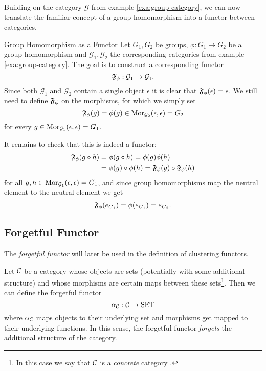 Building on the category $\mathcal{G}$ from example \ref{exa:group-category}, we can now translate the familiar concept of a group homomorphism into a functor between categories.

\begin{example}{Group Homomorphism as a Functor}{}
Let $G_1, G_2$ be groups, $\phi: G_1 \to G_2$ be a group homomorphism and $\mathcal{G}_1,\mathcal{G}_2$ the corresponding categories from example \ref{exa:group-category}. The goal is to construct a corresponding functor 
$$
\mathfrak{F}_\phi: \mathcal{G}_1 \to \mathcal{G}_1.
$$
Since both $\mathcal{G}_1$ and $\mathcal{G}_2$ contain a single object $\epsilon$ it is clear that $\mathfrak{F}_\phi(\epsilon) = \epsilon$. We still need to define $\mathfrak{F}_\phi$ on the morphisms, for which we simply set
$$
\mathfrak{F}_\phi(g) = \phi(g) \in \mathrm {Mor}_{\mathcal{G}_2}(\epsilon, \epsilon) = G_2
$$
for every $g \in \mathrm {Mor}_{\mathcal{G}_1}(\epsilon, \epsilon) = G_1$. \par

\medskip It remains to check that this is indeed a functor:
\begin{equation*}
\begin{split}
\mathfrak{F}_\phi(g \circ h) &= \phi(g \circ h) = \phi(g)\phi(h) \\
&= \phi(g) \circ \phi(h) = \mathfrak{F}_\phi(g) \circ \mathfrak{F}_\phi(h)
\end{split}
\end{equation*}
for all $g,h \in \mathrm {Mor}_{\mathcal{G}_1}(\epsilon, \epsilon) = G_1$, and since group homomorphisms map the neutral element to the neutral element we get
\begin{equation*}
\mathfrak{F}_\phi(e_{G_1}) = \phi(e_{G_1}) = e_{G_2}.
\end{equation*}
\end{example}

\subsection{Forgetful Functor}
The \emph{forgetful functor} will later be used in the definition of clustering functors.

\begin{definition}{\cite[Chap.~1~Ex.~10]{Roman2017}}{}
Let $\mathcal{C}$ be a category whose objects are sets (potentially with some additional structure) and whose morphisms are certain maps between these sets\footnote{In this case we say that $\mathcal{C}$ is a \emph{concrete} category \cite[p.~11]{Roman2017}.}. Then we can define the forgetful functor
$$
\alpha_{\mathcal{C}}: \mathcal{C} \to \mathrm{SET}
$$
where $\alpha_{\mathcal{C}}$ maps objects to their underlying set and morphisms get mapped to their underlying functions. In this sense, the forgetful functor \emph{forgets} the additional structure of the category.
\end{definition}

